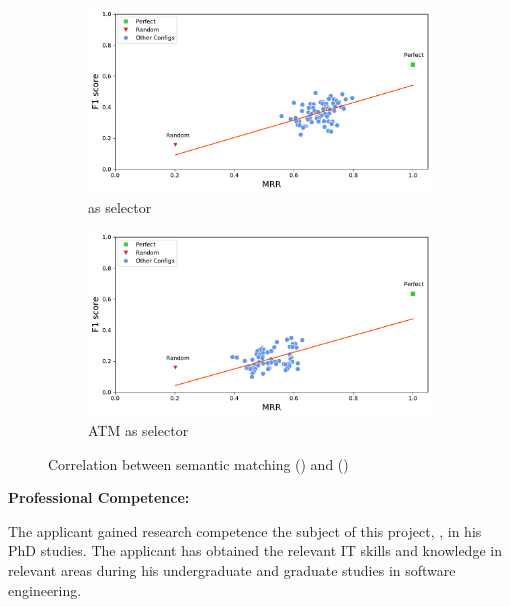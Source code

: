 \begin{figure}[H]
	\centering
	\begin{subfigure}{.5\textwidth}
		\centering
		\includegraphics[width=1\linewidth]{images/MRR_craftdroid_all_oracle_included.pdf}
		\caption{\craftdroid as selector}
		\label{fig:MRR_craftdroid_all_oracle_full}
	\end{subfigure}%
	\begin{subfigure}{.5\textwidth}
		\centering
		\includegraphics[width=1\linewidth]{images/MRR_atm_atm_oracle_included_passfree.pdf}
		\caption{ ATM as selector}
		\label{fig:MRR_atm_atm_oracle_passfree_full.pdf}
	\end{subfigure}
	\caption{Correlation between semantic matching (\mrr) and \testreuse (\fscore)}
	\label{fig:MRR-F1-scatter}
\end{figure}

\noindent
\textbf{Professional Competence:}

\noindent
The applicant gained research competence the subject of this project, \testreuse, in his PhD studies.
The applicant has obtained the relevant IT skills and knowledge in relevant areas during his undergraduate and graduate studies in software engineering.














